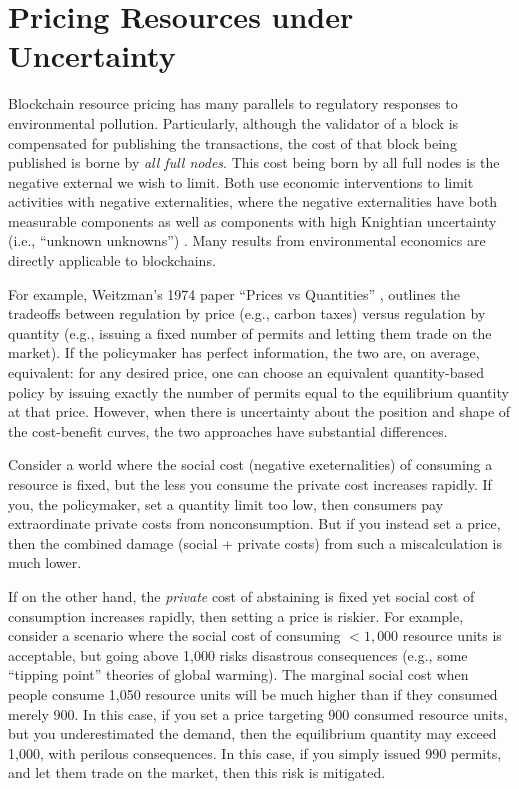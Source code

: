 \documentclass[12pt, final]{article}
\begin{document}
\section{Pricing Resources under Uncertainty}
\label{sect:uncertainty}
Blockchain resource pricing has many parallels to regulatory responses to environmental pollution.  Particularly, although the validator of a block is compensated for publishing the transactions, the cost of that block being published is borne by \emph{all full nodes}.  This cost being born by all full nodes is the negative external we wish to limit.  Both use economic interventions to limit activities with negative externalities, where the negative externalities have both measurable components as well as components with high Knightian uncertainty (i.e., ``unknown unknowns'') \cite{knight1921risk}.  Many results from environmental economics \cite{barder14} are directly applicable to blockchains.

For example, Weitzman's 1974 paper ``Prices vs Quantities'' \cite{weitzman1974prices}, outlines the tradeoffs between regulation by price (e.g., carbon taxes) versus regulation by quantity (e.g., issuing a fixed number of permits and letting them trade on the market). If the policymaker has perfect information, the two are, on average, equivalent: for any desired price, one can choose an equivalent quantity-based policy by issuing exactly the number of permits equal to the equilibrium quantity at that price. However, when there is uncertainty about the position and shape of the cost-benefit curves, the two approaches have substantial differences.

Consider a world where the social cost (negative exeternalities) of consuming a resource is fixed, but the less you consume the private cost increases rapidly. If you, the policymaker, set a quantity limit too low, then consumers pay extraordinate private costs from nonconsumption.  But if you instead set a price, then the combined damage (social + private costs) from such a miscalculation is much lower.

If on the other hand, the \emph{private} cost of abstaining is fixed yet social cost of consumption increases rapidly, then setting a price is riskier. For example, consider a scenario where the social cost of consuming $<1,000$ resource units is acceptable, but going above 1,000 risks disastrous consequences (e.g., some ``tipping point'' theories of global warming\cite{wiki:runaway}). The marginal social cost  when people consume 1,050 resource units will be much higher than if they consumed merely 900.  In this case, if you set a price targeting 900 consumed resource units, but you underestimated the demand, then the equilibrium quantity may exceed 1,000, with perilous consequences.  In this case, if you simply issued 990 permits, and let them trade on the market, then this risk is mitigated.
\end{document}
